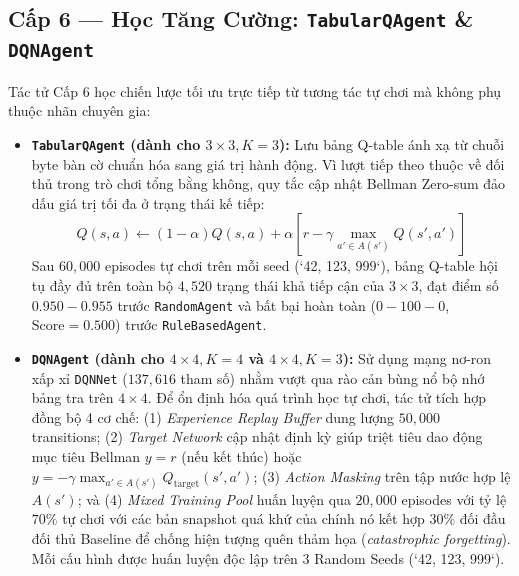 \documentclass[a4paper,12pt]{report}
\begin{document}
\subsection{Cấp 6 --- Học Tăng Cường: \texttt{TabularQAgent} \& \texttt{DQNAgent}}
Tác tử Cấp 6 học chiến lược tối ưu trực tiếp từ tương tác tự chơi mà không phụ thuộc nhãn chuyên gia:
\begin{itemize}[leftmargin=1.2cm]
    \item \textbf{\texttt{TabularQAgent} (dành cho $3 \times 3, K=3$):} Lưu bảng Q-table ánh xạ từ chuỗi byte bàn cờ chuẩn hóa sang giá trị hành động. Vì lượt tiếp theo thuộc về đối thủ trong trò chơi tổng bằng không, quy tắc cập nhật Bellman Zero-sum đảo dấu giá trị tối đa ở trạng thái kế tiếp:
    \begin{equation}
        Q(s, a) \leftarrow (1 - \alpha) Q(s, a) + \alpha \left[ r - \gamma \max_{a' \in A(s')} Q(s', a') \right]
    \end{equation}
    Sau $60{,}000$ episodes tự chơi trên mỗi seed (`42, 123, 999`), bảng Q-table hội tụ đầy đủ trên toàn bộ $4{,}520$ trạng thái khả tiếp cận của $3 \times 3$, đạt điểm số $0.950 - 0.955$ trước \texttt{RandomAgent} và bất bại hoàn toàn ($0-100-0$, $\text{Score} = 0.500$) trước \texttt{RuleBasedAgent}.
    \item \textbf{\texttt{DQNAgent} (dành cho $4 \times 4, K=4$ và $4 \times 4, K=3$):} Sử dụng mạng nơ-ron xấp xỉ \texttt{DQNNet} ($137{,}616$ tham số) nhằm vượt qua rào cản bùng nổ bộ nhớ bảng tra trên $4\times 4$. Để ổn định hóa quá trình học tự chơi, tác tử tích hợp đồng bộ 4 cơ chế: (1) \textit{Experience Replay Buffer} dung lượng $50{,}000$ transitions; (2) \textit{Target Network} cập nhật định kỳ giúp triệt tiêu dao động mục tiêu Bellman $y = r$ (nếu kết thúc) hoặc $y = -\gamma \max_{a' \in A(s')} Q_{\text{target}}(s', a')$; (3) \textit{Action Masking} trên tập nước hợp lệ $A(s')$; và (4) \textit{Mixed Training Pool} huấn luyện qua $20{,}000$ episodes với tỷ lệ $70\%$ tự chơi với các bản snapshot quá khứ của chính nó kết hợp $30\%$ đối đầu đối thủ Baseline để chống hiện tượng quên thảm họa (\textit{catastrophic forgetting}). Mỗi cấu hình được huấn luyện độc lập trên 3 Random Seeds (`42, 123, 999`).
\end{itemize}
\end{document}

